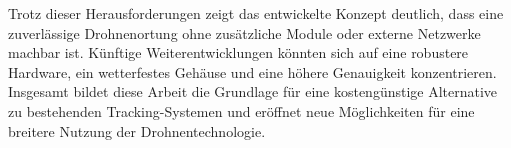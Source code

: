 Trotz dieser Herausforderungen zeigt das entwickelte Konzept deutlich, dass eine zuverlässige Drohnenortung ohne zusätzliche Module oder externe Netzwerke machbar ist. Künftige Weiterentwicklungen könnten sich auf eine robustere Hardware, ein wetterfestes Gehäuse und eine höhere Genauigkeit konzentrieren. Insgesamt bildet diese Arbeit die Grundlage für eine kostengünstige Alternative zu bestehenden Tracking-Systemen und eröffnet neue Möglichkeiten für eine breitere Nutzung der Drohnentechnologie.
